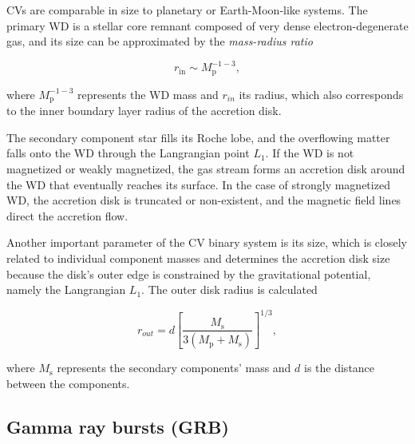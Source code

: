 CVs are comparable in size to planetary or Earth-Moon-like systems. The primary WD is a stellar core remnant composed of very dense electron-degenerate gas, and its size can be approximated by the \emph{mass-radius ratio} \cite{shapiro1983}

\begin{equation}
    r_{\textrm{in}} \sim M^{-1-3}_{\textrm{p}},
    \label{eq:mass_radius_ratio}
\end{equation}

where $M^{-1-3}_{\textrm{p}}$ represents the WD mass and $r_{in}$ its radius, which also corresponds to the inner boundary layer radius of the accretion disk.

The secondary component star fills its Roche lobe, and the overflowing matter falls onto the WD through the Langrangian point $L_1$. If the WD is not magnetized or weakly magnetized, the gas stream forms an accretion disk around the WD that eventually reaches its surface. In the case of strongly magnetized WD, the accretion disk is truncated or non-existent, and the magnetic field lines direct the accretion flow. 

Another important parameter of the CV binary system is its size, which is closely related to individual component masses and determines the accretion disk size because the disk's outer edge is constrained by the gravitational potential, namely the Langrangian $L_1$. The outer disk radius is calculated

\begin{equation}
    r_{out} = d \left[ \frac{M_{\textrm{s}}}{3(M_{\textrm{p}}+M_{\textrm{s}})} \right]^{1/3},
    \label{eq:disk_outher_radius}
\end{equation}

where $M_{\textrm{s}}$ represents the secondary components' mass and $d$ is the distance between the components. 
\subsection{Gamma ray bursts (GRB)}














